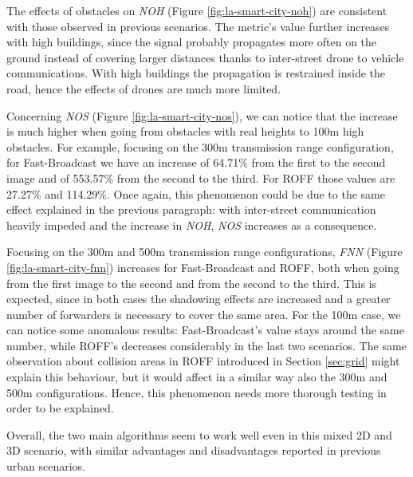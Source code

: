 	
	The effects of obstacles on \textit{NOH} (Figure \ref{fig:la-smart-city-noh}) are consistent with those observed in previous scenarios. The metric's value further increases with high buildings, since the signal probably propagates more often on the ground instead of covering larger distances thanks to inter-street drone to vehicle communications. With high buildings the propagation is restrained inside the road, hence the effects of drones are much more limited.
	
	
	Concerning \textit{NOS} (Figure \ref{fig:la-smart-city-nos}), we can notice that the increase is much higher when going from obstacles with real heights to 100m high obstacles. For example, focusing on the 300m transmission range configuration, for Fast-Broadcast we have an increase of 64.71\% from the first to the second image and of 553.57\% from the second to the third. For ROFF those values are 27.27\% and 114.29\%. Once again, this phenomenon could be due to the same effect explained in the previous paragraph: with inter-street communication heavily impeded and the increase in \textit{NOH}, \textit{NOS} increases as a consequence.
	
	
	Focusing on the 300m and 500m transmission range configurations, \textit{FNN} (Figure \ref{fig:la-smart-city-fnn}) increases for Fast-Broadcast and ROFF, both when going from the first image to the second and from the second to the third. This is expected, since in both cases the shadowing effects are increased and a greater number of forwarders is necessary to cover the same area. For the 100m case, we can notice some anomalous results: Fast-Broadcast's value stays around the same number, while ROFF's decreases considerably in the last two scenarios. The same observation about collision areas in ROFF introduced in Section \ref{sec:grid} might explain this behaviour, but it would affect in a similar way also the 300m and 500m configurations. Hence, this phenomenon needs more thorough testing in order to be explained.
	
	
	Overall, the two main algorithms seem to work well even in this mixed 2D and 3D scenario, with similar advantages and disadvantages reported in previous urban scenarios.
	

